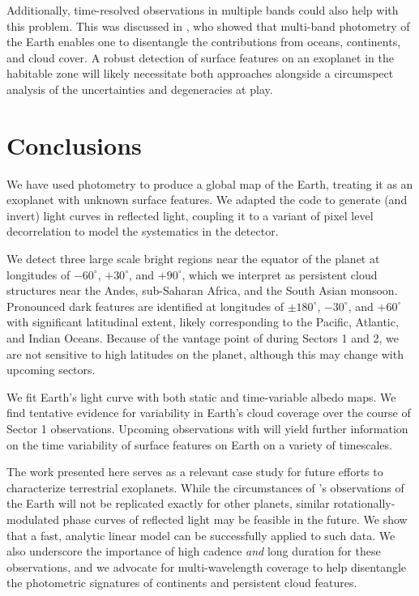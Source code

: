 \documentclass[modern]{aastex62}
\begin{document}
Additionally, time-resolved observations in multiple bands could
also help with this problem. This was discussed in \cite{Cowan2009},
who showed that multi-band photometry of the Earth enables one to
disentangle the contributions from oceans, continents, and cloud cover.
A robust detection of surface features on an exoplanet in the habitable
zone will likely necessitate both approaches alongside a circumspect
analysis of the uncertainties and degeneracies at play.

\section{Conclusions}
\label{sec:conclusions}

We have used \TESS photometry to
produce a global map of the Earth, treating it as an exoplanet with unknown
surface features. We adapted the \starry code to 
generate (and invert) light curves in reflected light, coupling it
to a variant of pixel level decorrelation to model the systematics
in the \TESS detector. 

We detect three large scale bright regions near
the equator of the planet at longitudes of 
$-60^\circ$, $+30^\circ$, and $+90^\circ$, 
which we interpret as persistent cloud structures 
near the Andes, sub-Saharan Africa, and the South Asian monsoon. 
Pronounced dark features are identified
at longitudes of $\pm 180^\circ$, $-30^\circ$, and $+60^\circ$ with
significant latitudinal extent, likely corresponding to 
the Pacific, Atlantic, and Indian Oceans. Because of the
vantage point of \TESS during Sectors 1 and 2, we are not sensitive to
high latitudes on the planet, although this may change with upcoming
sectors. 

We fit Earth's light curve with both static and time-variable albedo maps. 
We find tentative evidence for variability in Earth's cloud coverage over 
the course of Sector 1 observations. 
Upcoming observations with \TESS will yield further information on 
the time variability of surface features on Earth on a variety of timescales.


The work presented here serves as a relevant case study for future 
efforts to characterize terrestrial exoplanets. While the circumstances of \TESS's 
observations of the Earth will not be replicated exactly for other planets, similar 
rotationally-modulated phase curves of reflected light may be feasible in the future. 
We show that a fast, analytic linear model can be successfully applied to such data. 
We also underscore the importance of high cadence \emph{and} long duration for 
these observations, and we advocate for multi-wavelength coverage to 
help disentangle the photometric signatures of continents and persistent cloud features.
\end{document}
